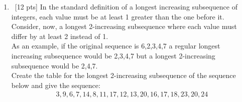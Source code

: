 \documentclass[12pt]{article}
\begin{document}
\begin{enumerate}
    \item \ [12 pts] In the standard definition of a longest increasing subsequence of integers, each value must be at least 1 greater than the one before it. Consider, now, a longest 2-increasing subsequence where each value must differ by at least 2 instead of 1.\\
    As an example, if the original sequence is 6,2,3,4,7 a regular longest increasing subsequence would be 2,3,4,7 but a longest 2-increasing subsequence would be 2,4,7.\\
    Create the table for the longest 2-increasing subsequence of the sequence below and give the sequence:
    \begin{align*}
        3, 9, 6, 7, 14, 8, 11, 17, 12, 13, 20, 16, 17, 18, 23, 20, 24
    \end{align*}


\end{enumerate}
\end{document}
